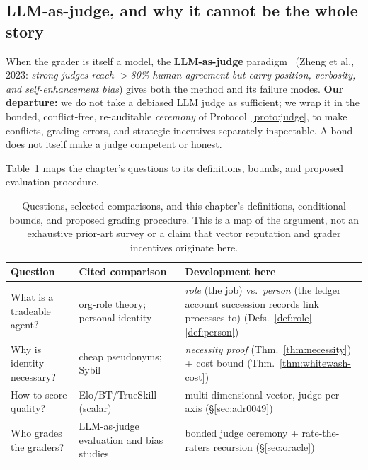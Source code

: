 \documentclass[11pt,a4paper]{article}
\theoremstyle{definition}
\begin{document}
\ifdefined\pdswisslandmarkplate
\begin{figure}[p]
  \centering
\end{figure}
\pdmarginpagebreak
\fi

\subsection{LLM-as-judge, and why it cannot be the whole story}

When the grader is itself a model, the \textbf{LLM-as-judge}
paradigm~ (Zheng et al., 2023: \emph{strong judges reach
$>$80\% human agreement but carry position, verbosity, and self-enhancement bias})
gives both the method and its failure modes. \textbf{Our departure:} we do not take
a debiased LLM judge as sufficient; we wrap it in the bonded, conflict-free,
re-auditable \emph{ceremony} of Protocol~\ref{proto:judge}, to make conflicts, grading errors, and strategic incentives separately
inspectable. A bond does not itself make a judge competent or honest.

Table~\ref{tab:contributions} maps the chapter's questions to its definitions,
bounds, and proposed evaluation procedure.

\begin{table}[H]
\centering\small\renewcommand{\arraystretch}{1.3}
\begin{tabularx}{\textwidth}{@{}>{\raggedright\arraybackslash}X >{\raggedright\arraybackslash}X >{\raggedright\arraybackslash}X@{}}
\toprule
\textbf{Question} & \textbf{Cited comparison} & \textbf{Development here} \\
\midrule
What is a tradeable agent? & org-role theory; personal identity & \emph{role} (the job) vs.\ \emph{person} (the ledger account succession records link processes to) (Defs.~\ref{def:role}--\ref{def:person}) \\
Why is identity necessary? & cheap pseudonyms; Sybil & \emph{necessity proof} (Thm.~\ref{thm:necessity}) + cost bound (Thm.~\ref{thm:whitewash-cost}) \\
How to score quality? & Elo/BT/TrueSkill (scalar) & multi-dimensional vector, judge-per-axis (\S\ref{sec:adr0049}) \\
Who grades the graders? & LLM-as-judge evaluation and bias studies & bonded judge ceremony + rate-the-raters recursion (\S\ref{sec:oracle}) \\
\bottomrule
\end{tabularx}
\caption{Questions, selected comparisons, and this chapter's definitions,
conditional bounds, and proposed grading procedure. This is a map of the argument,
not an exhaustive prior-art survey or a claim that vector reputation and grader
incentives originate here.}
\label{tab:contributions}
\end{table}
\end{document}
